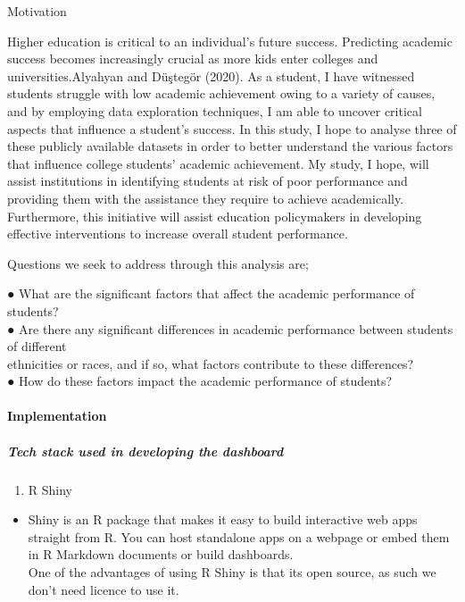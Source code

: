 \documentclass[
]{article}
\providecommand{\tightlist}{%
  \setlength{\itemsep}{0pt}\setlength{\parskip}{0pt}}
\begin{document}
Motivation

Higher education is critical to an individual's future success.
Predicting academic success becomes increasingly crucial as more kids
enter colleges and universities.Alyahyan and Düştegör (2020). As a
student, I have witnessed students struggle with low academic
achievement owing to a variety of causes, and by employing data
exploration techniques, I am able to uncover critical aspects that
influence a student's success. In this study, I hope to analyse three of
these publicly available datasets in order to better understand the
various factors that influence college students' academic achievement.
My study, I hope, will assist institutions in identifying students at
risk of poor performance and providing them with the assistance they
require to achieve academically. Furthermore, this initiative will
assist education policymakers in developing effective interventions to
increase overall student performance.

Questions we seek to address through this analysis are;

● What are the significant factors that affect the academic performance
of students?\\
● Are there any significant differences in academic performance between
students of different\\
ethnicities or races, and if so, what factors contribute to these
differences?\\
● How do these factors impact the academic performance of students?

\newpage

\hypertarget{implementation-1}{%
\paragraph{Implementation}\label{implementation-1}}

\hypertarget{tech-stack-used-in-developing-the-dashboard}{%
\subparagraph{Tech stack used in developing the
dashboard}\label{tech-stack-used-in-developing-the-dashboard}}

\begin{enumerate}
\def\labelenumi{\arabic{enumi}.}
\tightlist
\item
  R Shiny\\
\end{enumerate}

\begin{itemize}
\tightlist
\item
  Shiny is an R package that makes it easy to build interactive web apps
  straight from R. You can host standalone apps on a webpage or embed
  them in R Markdown documents or build dashboards.\\
  One of the advantages of using R Shiny is that its open source, as
  such we don't need licence to use it.
\end{itemize}
\end{document}

